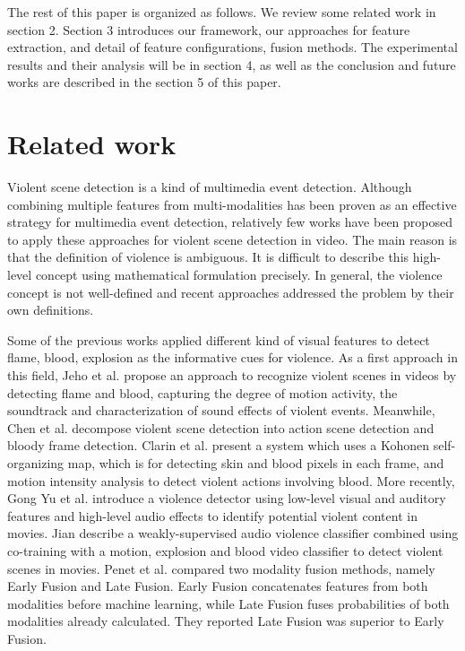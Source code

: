 \documentclass[review]{elsarticle}
\begin{document}
The rest of this paper is organized as follows. We review some related work in section 2. Section 3 introduces our framework, our approaches for feature extraction, and detail of feature configurations, fusion methods. The experimental results and their analysis will be in section 4, as well as the conclusion and future works are described in the section 5 of this paper.
\section{Related work}
Violent scene detection is a kind of multimedia event detection. Although combining multiple features from multi-modalities has been proven as an effective strategy for multimedia event detection, relatively few works have been proposed to apply these approaches for violent scene detection in video. The main reason is that the definition of violence is ambiguous. It is difficult to describe this high-level concept using mathematical formulation precisely. In general, the violence concept is not well-defined and recent approaches addressed the problem by their own definitions.

Some of the previous works applied different kind of visual features to detect flame, blood, explosion as the informative cues for violence. As a first approach in this field, Jeho et al.\cite{nam1998audio} propose an approach to recognize violent scenes in videos by detecting flame and blood, capturing the degree of motion activity, the soundtrack and characterization of sound effects of violent events. Meanwhile, Chen et al.\cite{2} decompose violent scene detection into action scene detection and bloody frame detection. Clarin et al.\cite{3} present a system which uses a Kohonen self-organizing map, which is for detecting skin and blood pixels in each frame, and motion intensity analysis to detect violent actions involving blood. More recently, Gong Yu et al.\cite{11} introduce a violence detector using low-level visual and auditory features and high-level audio effects to identify potential violent content in movies. Jian \cite{17} describe a weakly-supervised audio violence classifier combined using co-training with a motion, explosion and blood video classifier to detect violent scenes in movies. Penet et al.\cite{21} compared two modality fusion methods, namely Early Fusion and Late Fusion. Early Fusion concatenates features from both modalities before machine learning, while Late Fusion fuses probabilities of both modalities already calculated. They reported Late Fusion was superior to Early Fusion.
\end{document}
